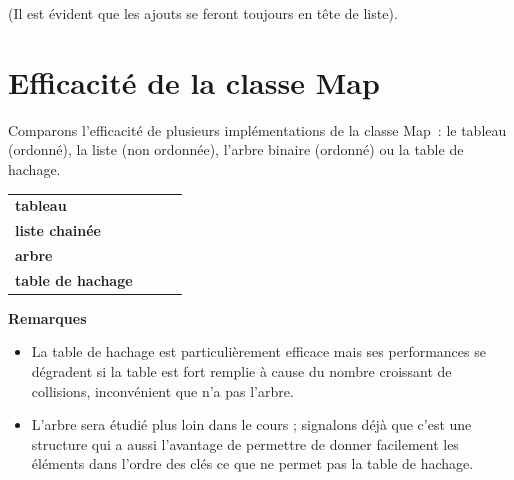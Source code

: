 		(Il est évident que les ajouts se feront toujours en tête de liste).


\section{Efficacité de la classe Map}

	Comparons l'efficacité de plusieurs implémentations de la classe Map~: 
	le tableau (ordonné), la liste (non ordonnée),
	l'arbre binaire (ordonné) ou la table de hachage.

	\begin{center}
		\tablefirsthead{}
		\tablehead{}
		\tabletail{}
		\tablelasttail{}
		\begin{supertabular}{|m{3.3669999cm}|m{1.9679999cm}|m{1.8cm}|m{2.34cm}|}
		\hhline{~---}
		 &
		 &
		 &
		\centering{}\\\hline
		{\bfseries tableau} &
		 &
		 &
		\centering{}\\\hline
		{\bfseries liste chainée} &
		 &
		 &
		\centering{}\\\hline
		{\bfseries arbre} &
		 &
		 &
		\centering{}\\\hline
		{\bfseries table de hachage} &
		 &
		 &
		\centering{}\\\hline
		\end{supertabular}
	\end{center}

	\textbf{Remarques}

	\begin{itemize}
		\item {
			La table de hachage est particulièrement efficace mais 
			ses performances se dégradent si la table est fort remplie à
			cause du nombre croissant de collisions, inconvénient que 
			n'a pas l'arbre.}
		\item {
			L'arbre sera étudié plus loin dans le cours ; signalons déjà 
			que c'est une structure qui a aussi l'avantage de permettre
			de donner facilement les éléments dans l'ordre des clés ce 
			que ne permet pas la table de hachage.}
	\end{itemize}



